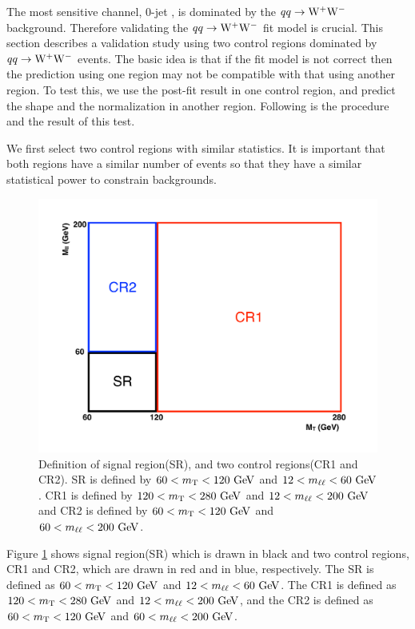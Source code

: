 The most sensitive channel, 0-jet \DF, is dominated by the $qq\rightarrow\mathrm{W}^+\mathrm{W}^-$ background. 
Therefore validating the $qq\rightarrow\mathrm{W}^+\mathrm{W}^-$ fit model is crucial. 
This section describes a validation study using two 
control regions dominated by $qq\rightarrow\mathrm{W}^+\mathrm{W}^-$ events.
The basic idea is that if the fit model is not correct then the prediction using 
one region may not be compatible with that using another region. To test this, 
we use the post-fit result in one control region, and predict the shape 
and the normalization in another region. 
Following is the procedure and the result of this test. 

We first select two control regions with similar statistics. It is important that 
both regions have a similar number of events so that they have a similar statistical 
power to constrain backgrounds. 
%
\begin{figure}[!hbtp]
\centering
\includegraphics[width=.6\textwidth]{figures/WWctl_scheme.pdf}
\caption{Definition of signal region(SR), and two control regions(CR1 and CR2). 
SR is defined by $60<m_{\mathrm{T}}<120~\mathrm{Ge\kern -0.1em V}$ and $12<m_{\ell\ell}<60~\mathrm{Ge\kern -0.1em V}$. 
CR1 is defined by $120<m_{\mathrm{T}}<280~\mathrm{Ge\kern -0.1em V}$ and $12<m_{\ell\ell}<200~\mathrm{Ge\kern -0.1em V}$ and 
CR2 is defined by $60<m_{\mathrm{T}}<120~\mathrm{Ge\kern -0.1em V}$ and $60<m_{\ell\ell}<200~\mathrm{Ge\kern -0.1em V}$. }
\label{fig:WWctlregions}
\end{figure}
Figure \ref{fig:WWctlregions} shows signal region(SR) which is drawn in black 
and two control regions, CR1 and CR2, which are drawn in red and in blue, respectively. 
The SR is defined as $60<m_{\mathrm{T}}<120~\mathrm{Ge\kern -0.1em V}$ and $12<m_{\ell\ell}<60~\mathrm{Ge\kern -0.1em V}$. 
The CR1 is defined as $120<m_{\mathrm{T}}<280~\mathrm{Ge\kern -0.1em V}$ and $12<m_{\ell\ell}<200~\mathrm{Ge\kern -0.1em V}$, 
and the CR2 is defined as $60<m_{\mathrm{T}}<120~\mathrm{Ge\kern -0.1em V}$ and $60<m_{\ell\ell}<200~\mathrm{Ge\kern -0.1em V}$. 
%
